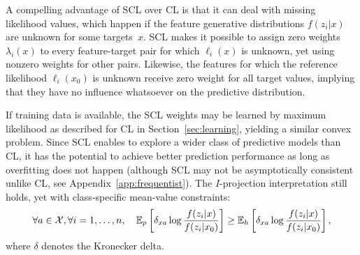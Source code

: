 \documentclass[english]{scrartcl}
\newcommand{\E}{\mathbb{E}}
\begin{document}
A compelling advantage of SCL over CL is that it can deal with missing likelihood values, which happen if the feature generative distributions $f(z_i|x)$ are unknown for some targets~$x$. SCL makes it possible to assign zero weights $\lambda_i(x)$ to every feature-target pair for which $\ell_i(x)$ is unknown, yet using nonzero weights for other pairs. Likewise, the features for which the reference likelihood $\ell_i(x_0)$ is unknown receive zero weight for all target values, implying that they have no influence whatsoever on the predictive distribution.


If training data is available, the SCL weights may be learned by maximum likelihood as described for CL in Section~\ref{sec:learning}, yielding a similar convex problem. Since SCL enables to explore a wider class of predictive models than CL, it has the potential to achieve better prediction performance as long as overfitting does not happen (although SCL may not be asymptotically consistent unlike CL, see Appendix~\ref{app:frequentist}). The $I$-projection interpretation still holds, yet with class-specific mean-value constraints:
$$
\forall a\in{\cal X}, \forall i=1,\ldots,n,
\quad
\E_p\left[\delta_{xa}\log \frac{f(z_i|x)}{f(z_i|x_0)}\right]
\geq \E_h\left[\delta_{xa}\log \frac{f(z_i|x)}{f(z_i|x_0)}\right],
$$
where $\delta$ denotes the Kronecker delta. 







\end{document}
